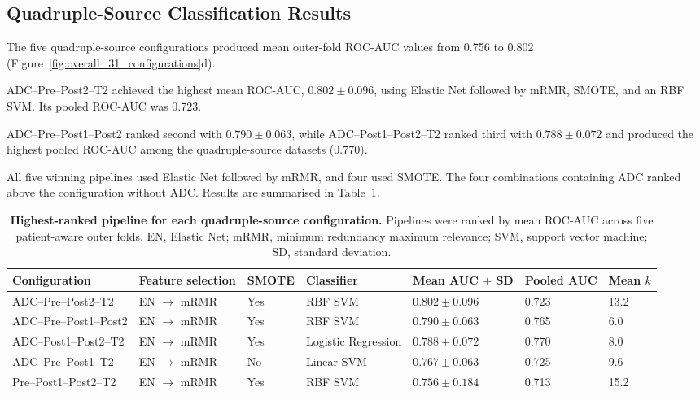 \documentclass[12pt,twocolumn]{article}
\begin{document}
\subsection{Quadruple-Source Classification Results}
\label{subsec:quadruple_source_results}

The five quadruple-source configurations produced mean outer-fold
ROC-AUC values from 0.756 to 0.802
(Figure~\ref{fig:overall_31_configurations}d).

ADC--Pre--Post2--T2 achieved the highest mean ROC-AUC,
\(0.802 \pm 0.096\), using Elastic Net followed by mRMR, SMOTE, and
an RBF SVM. Its pooled ROC-AUC was 0.723.

ADC--Pre--Post1--Post2 ranked second with
\(0.790 \pm 0.063\), while ADC--Post1--Post2--T2 ranked third with
\(0.788 \pm 0.072\) and produced the highest pooled ROC-AUC among the
quadruple-source datasets (0.770).

All five winning pipelines used Elastic Net followed by mRMR, and four
used SMOTE. The four combinations containing ADC ranked above the
configuration without ADC. Results are summarised in
Table~\ref{tab:quadruple_source_results}.

\begin{table}[htbp]
\centering
\caption{\textbf{Highest-ranked pipeline for each quadruple-source
configuration.} Pipelines were ranked by mean ROC-AUC across five
patient-aware outer folds. EN, Elastic Net; mRMR, minimum redundancy
maximum relevance; SVM, support vector machine; SD, standard
deviation.}
\label{tab:quadruple_source_results}
\small

\begin{tabularx}{\textwidth}{
    p{3.1cm}
    p{2.6cm}
    p{1.1cm}
    p{2.2cm}
    p{2.4cm}
    p{1.8cm}
    X
}
\toprule
\textbf{Configuration} &
\textbf{Feature selection} &
\textbf{SMOTE} &
\textbf{Classifier} &
\textbf{Mean AUC \(\pm\) SD} &
\textbf{Pooled AUC} &
\textbf{Mean \(k\)} \\
\midrule

ADC--Pre--Post2--T2 &
EN \(\rightarrow\) mRMR &
Yes &
RBF SVM &
\(\mathbf{0.802 \pm 0.096}\) &
0.723 &
13.2 \\

ADC--Pre--Post1--Post2 &
EN \(\rightarrow\) mRMR &
Yes &
RBF SVM &
\(0.790 \pm 0.063\) &
0.765 &
6.0 \\

ADC--Post1--Post2--T2 &
EN \(\rightarrow\) mRMR &
Yes &
Logistic Regression &
\(0.788 \pm 0.072\) &
\(\mathbf{0.770}\) &
8.0 \\

ADC--Pre--Post1--T2 &
EN \(\rightarrow\) mRMR &
No &
Linear SVM &
\(0.767 \pm 0.063\) &
0.725 &
9.6 \\

Pre--Post1--Post2--T2 &
EN \(\rightarrow\) mRMR &
Yes &
RBF SVM &
\(0.756 \pm 0.184\) &
0.713 &
15.2 \\

\bottomrule
\end{tabularx}
\end{table}
\end{document}
